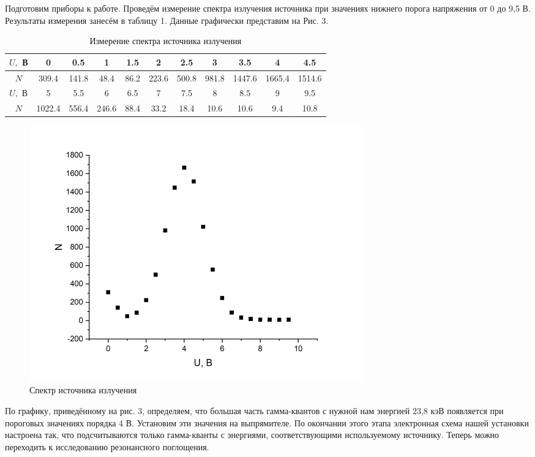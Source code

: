 \documentclass[a4paper,12pt]{article}
\theoremstyle{definition}
\begin{document}
Подготовим приборы к работе. Проведём измерение спектра излучения источника при значениях нижнего порога напряжения от 0 до 9,5 В. Результаты измерения занесём в таблицу 1. Данные графически представим на Рис. 3.

\begin{table}[h!]
\begin{tabular}{|c|c|c|c|c|c|c|c|c|c|c|}
\hline
$U, $ В & 0      & 0.5   & 1     & 1.5  & 2     & 2.5   & 3     & 3.5    & 4      & 4.5    \\ \hline
$N$     & 309.4  & 141.8 & 48.4  & 86.2 & 223.6 & 500.8 & 981.8 & 1447.6 & 1665.4 & 1514.6 \\ \hline
$U, $ В & 5      & 5.5   & 6     & 6.5  & 7     & 7.5   & 8     & 8.5    & 9      & 9.5    \\ \hline
$N$     & 1022.4 & 556.4 & 246.6 & 88.4 & 33.2  & 18.4  & 10.6  & 10.6   & 9.4    & 10.8   \\ \hline
\end{tabular}
\centering
\caption{Измерение спектра источника излучения}
\end{table}

\begin{figure}[h!]
\begin{center}
\includegraphics[width=0.7\textwidth]{3} %
\caption{Спектр источника излучения}
\end{center}
\end{figure}

По графику, приведённому на рис. 3, определяем, что большая часть гамма-квантов с нужной нам энергией 23,8 кэВ появляется при пороговых значениях порядка 4 В. Установим эти значения на выпрямителе. По окончании этого этапа электронная схема нашей установки настроена так, что подсчитываются только гамма-кванты с энергиями, соответствующими используемому источнику. Теперь можно переходить к исследованию резонансного поглощения.
\end{document}
